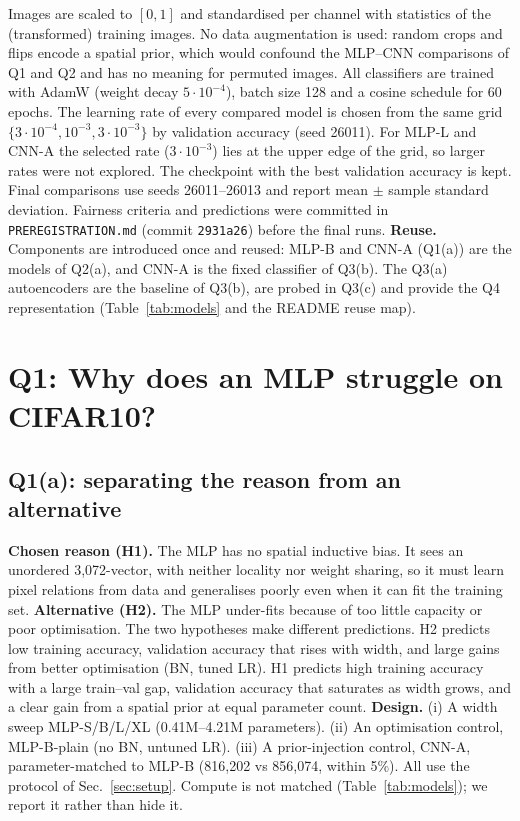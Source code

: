 \documentclass[10pt,twocolumn,letterpaper]{article}
\begin{document}
Images are scaled to $[0,1]$ and standardised per channel with statistics of the (transformed) training
images. No data augmentation is used: random crops and flips encode a spatial prior, which would confound
the MLP--CNN comparisons of Q1 and Q2 and has no meaning for permuted images. All classifiers are trained
with AdamW (weight decay $5\cdot10^{-4}$), batch size 128 and a cosine schedule for 60 epochs. The
learning rate of every compared model is chosen from the same grid $\{3\cdot10^{-4},10^{-3},3\cdot10^{-3}\}$
by validation accuracy (seed 26011). For MLP-L and CNN-A the selected rate ($3\cdot10^{-3}$) lies at the upper edge of the grid, so larger rates were not explored. The checkpoint with the best validation accuracy is kept. Final
comparisons use seeds 26011--26013 and report mean $\pm$ sample standard deviation. Fairness criteria and
predictions were committed in \texttt{PREREGISTRATION.md} (commit \texttt{2931a26}) before the final runs.
\textbf{Reuse.} Components are introduced once and reused: MLP-B and CNN-A (Q1(a)) are the models of
Q2(a), and CNN-A is the fixed classifier of Q3(b). The Q3(a) autoencoders are the baseline of Q3(b), are
probed in Q3(c) and provide the Q4 representation (Table~\ref{tab:models} and the README reuse map).

\section{Q1: Why does an MLP struggle on CIFAR10?}
\subsection{Q1(a): separating the reason from an alternative}
\textbf{Chosen reason (H1).} The MLP has no spatial inductive bias. It sees an unordered 3,072-vector,
with neither locality nor weight sharing, so it must learn pixel relations from data and generalises
poorly even when it can fit the training set. \textbf{Alternative (H2).} The MLP under-fits because of
too little capacity or poor optimisation. The two hypotheses make different predictions. H2 predicts low
training accuracy, validation accuracy that rises with width, and large gains from better optimisation
(BN, tuned LR). H1 predicts high training accuracy with a large train--val gap, validation accuracy that
saturates as width grows, and a clear gain from a spatial prior at equal parameter count.
\textbf{Design.} (i) A width sweep MLP-S/B/L/XL (0.41M--4.21M parameters). (ii) An optimisation control,
MLP-B-plain (no BN, untuned LR). (iii) A prior-injection control, CNN-A, parameter-matched to MLP-B
(816,202 vs 856,074, within 5\%). All use the protocol of Sec.~\ref{sec:setup}. Compute is not matched
(Table~\ref{tab:models}); we report it rather than hide it.
\end{document}
